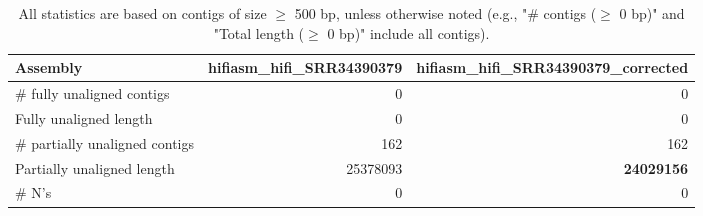 \documentclass[12pt,a4paper]{article}
\begin{document}
\begin{table}[ht]
\begin{center}
\caption{All statistics are based on contigs of size $\geq$ 500 bp, unless otherwise noted (e.g., "\# contigs ($\geq$ 0 bp)" and "Total length ($\geq$ 0 bp)" include all contigs).}
\begin{tabular}{|l*{2}{|r}|}
\hline
Assembly & hifiasm\_hifi\_SRR34390379 & hifiasm\_hifi\_SRR34390379\_corrected \\ \hline
\# fully unaligned contigs & 0 & 0 \\ \hline
Fully unaligned length & 0 & 0 \\ \hline
\# partially unaligned contigs & 162 & 162 \\ \hline
Partially unaligned length & 25378093 & {\bf 24029156} \\ \hline
\# N's & 0 & 0 \\ \hline
\end{tabular}
\end{center}
\end{table}
\end{document}
